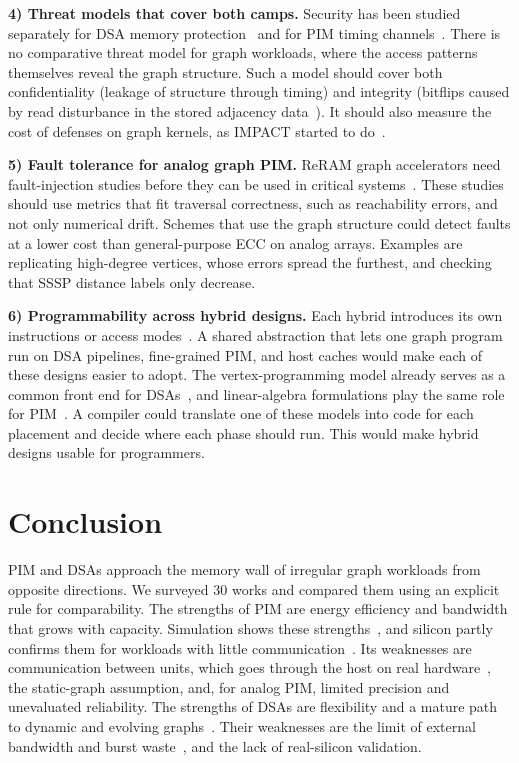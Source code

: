 \documentclass[journal,onecolumn]{IEEEtran}
\begin{document}
\textbf{4) Threat models that cover both camps.} Security has been studied separately for DSA memory protection~\cite{hua2022mgx} and for PIM timing channels~\cite{bostanci2025impact}. There is no comparative threat model for graph workloads, where the access patterns themselves reveal the graph structure. Such a model should cover both confidentiality (leakage of structure through timing) and integrity (bitflips caused by read disturbance in the stored adjacency data~\cite{yuksel2026pid}). It should also measure the cost of defenses on graph kernels, as IMPACT started to do~\cite{bostanci2025impact}.

\textbf{5) Fault tolerance for analog graph PIM.} ReRAM graph accelerators need fault-injection studies before they can be used in critical systems~\cite{song2018graphr,zheng2020spara}. These studies should use metrics that fit traversal correctness, such as reachability errors, and not only numerical drift. Schemes that use the graph structure could detect faults at a lower cost than general-purpose ECC on analog arrays. Examples are replicating high-degree vertices, whose errors spread the furthest, and checking that SSSP distance labels only decrease.

\textbf{6) Programmability across hybrid designs.} Each hybrid introduces its own instructions or access modes~\cite{shin2025piccolo,shin2025fala,yenimol2026cograf}. A shared abstraction that lets one graph program run on DSA pipelines, fine-grained PIM, and host caches would make each of these designs easier to adopt. The vertex-programming model already serves as a common front end for DSAs~\cite{ham2016graphicionado}, and linear-algebra formulations play the same role for PIM~\cite{barkhordar2025alphapim}. A compiler could translate one of these models into code for each placement and decide where each phase should run. This would make hybrid designs usable for programmers.

\section{Conclusion}
PIM and DSAs approach the memory wall of irregular graph workloads from opposite directions. We surveyed 30 works and compared them using an explicit rule for comparability. The strengths of PIM are energy efficiency and bandwidth that grows with capacity. Simulation shows these strengths~\cite{ahn2015tesseract,zhuo2019graphq}, and silicon partly confirms them for workloads with little communication~\cite{gomezluna2022prim,cai2024pimpam}. Its weaknesses are communication between units, which goes through the host on real hardware~\cite{gomezluna2022prim,barkhordar2025alphapim}, the static-graph assumption, and, for analog PIM, limited precision and unevaluated reliability. The strengths of DSAs are flexibility and a mature path to dynamic and evolving graphs~\cite{rahman2021jetstream,zhao2022tdgraph,gao2023mega}. Their weaknesses are the limit of external bandwidth and burst waste~\cite{shin2025piccolo,chen2022regraph}, and the lack of real-silicon validation.
\end{document}
